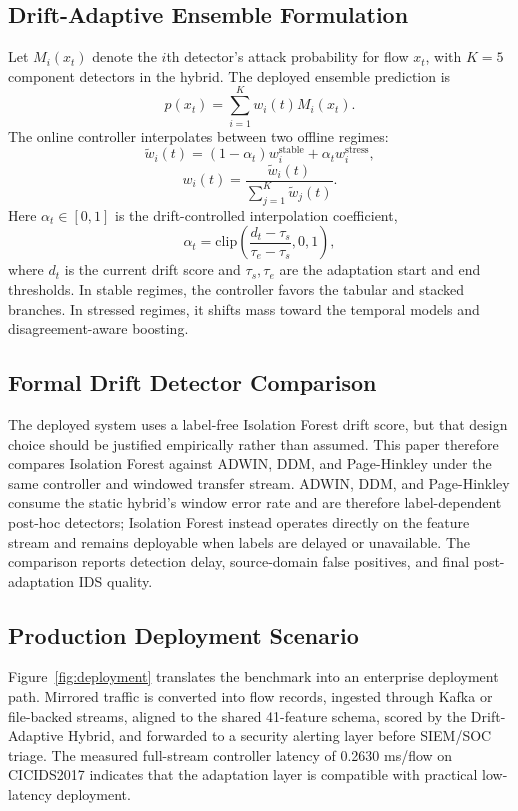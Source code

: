 \documentclass[conference]{IEEEtran}
\begin{document}
\subsection{Drift-Adaptive Ensemble Formulation}
Let $M_i(x_t)$ denote the $i$th detector's attack probability for flow $x_t$, with $K=5$ component detectors in the hybrid. The deployed ensemble prediction is
\begin{equation}
p(x_t) = \sum_{i=1}^{K} w_i(t) M_i(x_t).
\end{equation}
The online controller interpolates between two offline regimes:
\begin{equation}
\tilde{w}_i(t) = (1-\alpha_t) w_i^{\text{stable}} + \alpha_t w_i^{\text{stress}},
\end{equation}
\begin{equation}
w_i(t) = \frac{\tilde{w}_i(t)}{\sum_{j=1}^{K} \tilde{w}_j(t)}.
\end{equation}
Here $\alpha_t \in [0,1]$ is the drift-controlled interpolation coefficient,
\begin{equation}
\alpha_t = \mathrm{clip}\left(\frac{d_t - \tau_s}{\tau_e - \tau_s}, 0, 1\right),
\end{equation}
where $d_t$ is the current drift score and $\tau_s,\tau_e$ are the adaptation start and end thresholds. In stable regimes, the controller favors the tabular and stacked branches. In stressed regimes, it shifts mass toward the temporal models and disagreement-aware boosting.

\subsection{Formal Drift Detector Comparison}
The deployed system uses a label-free Isolation Forest drift score, but that design choice should be justified empirically rather than assumed. This paper therefore compares Isolation Forest against ADWIN, DDM, and Page-Hinkley under the same controller and windowed transfer stream. ADWIN, DDM, and Page-Hinkley consume the static hybrid's window error rate and are therefore label-dependent post-hoc detectors; Isolation Forest instead operates directly on the feature stream and remains deployable when labels are delayed or unavailable. The comparison reports detection delay, source-domain false positives, and final post-adaptation IDS quality.

\subsection{Production Deployment Scenario}
Figure~\ref{fig:deployment} translates the benchmark into an enterprise deployment path. Mirrored traffic is converted into flow records, ingested through Kafka or file-backed streams, aligned to the shared 41-feature schema, scored by the Drift-Adaptive Hybrid, and forwarded to a security alerting layer before SIEM/SOC triage. The measured full-stream controller latency of 0.2630 ms/flow on CICIDS2017 indicates that the adaptation layer is compatible with practical low-latency deployment.
\end{document}
